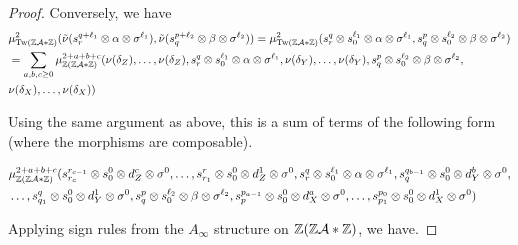 \documentclass[12pt]{article}
\begin{document}
\begin{proof}
		\noindent Conversely, we have
		\begin{align*}
			& \mu_{\textup{Tw}(\mathbb{Z} {\cal{A}} * \mathbb{Z})}^2(\tilde{\nu}(s^{q + \ell_1}_{r} \otimes \alpha \otimes \sigma^{\ell_1}),\tilde{\nu}(s^{p + \ell_2}_{q} \otimes \beta \otimes \sigma^{\ell_2})) = \mu_{\textup{Tw}(\mathbb{Z} {\cal{A}} * \mathbb{Z})}^2(s^{q}_{r} \otimes s^{\ell_1}_0 \otimes \alpha \otimes \sigma^{\ell_1}, s^{p}_{q} \otimes s^{\ell_2}_0 \otimes \beta \otimes \sigma^{\ell_2}) \\
			&= \sum_{a,b,c \geq 0} \mu_{\mathbb{Z} (\mathbb{Z} {\cal{A}} * \mathbb{Z})}^{2+a+b+c}(\nu(\delta_Z),\dots, \nu(\delta_Z),s^{q}_{r} \otimes s^{\ell_1}_0 \otimes \alpha \otimes \sigma^{\ell_1}, \nu(\delta_Y), \dots, \nu(\delta_Y),s^{p}_{q} \otimes s^{\ell_2}_0 \otimes \beta \otimes \sigma^{\ell_2}, \\
			&\nu(\delta_X), \dots, \nu(\delta_X)) \\
		\end{align*}
		
		\noindent Using the same argument as above, this is a sum of terms of the following form (where the morphisms are composable).
		
		\begin{align*}
			&\mu_{\mathbb{Z}(\mathbb{Z} {\cal{A}} * \mathbb{Z})}^{2+a+b+c}(s^{r_{c-1}}_{r_c} \otimes s^0_0 \otimes d_Z^c \otimes \sigma^0, \dots, s^{r}_{r_1} \otimes s^0_0 \otimes d_Z^1 \otimes \sigma^0,s^{q}_{r} \otimes s^{\ell_1}_0 \otimes \alpha \otimes \sigma^{\ell_1}, s^{q_{b-1}}_{q} \otimes s^0_0 \otimes d_Y^b \otimes \sigma^0, \\
			& \dots, s^{q}_{q_1} \otimes s^0_0 \otimes d_Y^1 \otimes \sigma^0, s^{p}_{q} \otimes s^{\ell_2}_0 \otimes \beta \otimes \sigma^{\ell_2}, s^{p_{a-1}}_{p} \otimes s^0_0 \otimes d_X^a \otimes \sigma^0, \dots, s^{p_0}_{p_1} \otimes s^0_0 \otimes d_X^1 \otimes \sigma^0  ) \\
		\end{align*}
		
		\noindent Applying sign rules from the $A_\infty$ structure on $\mathbb{Z} (\mathbb{Z} {\cal{A}} * \mathbb{Z})$, we have.
		

\end{proof}
\end{document}
